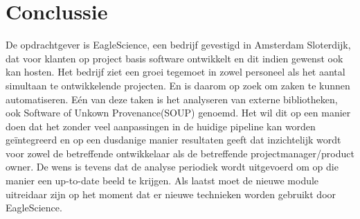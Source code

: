 \chapter{Conclussie}\label{ch:opdrachtconclussie}

De opdrachtgever is EagleScience, een bedrijf gevestigd in Amsterdam Sloterdijk, dat voor klanten op project basis software ontwikkelt en dit indien gewenst ook kan hosten. Het bedrijf ziet een groei tegemoet in zowel personeel als het aantal simultaan te ontwikkelende projecten. En is daarom op zoek om zaken te kunnen automatiseren. Eén van deze taken is het analyseren van externe bibliotheken, ook Software of Unkown Provenance(SOUP) genoemd. Het wil dit op een manier doen dat het zonder veel aanpassingen in de huidige pipeline kan worden geïntegreerd en op een dusdanige manier resultaten geeft dat inzichtelijk wordt voor zowel de betreffende ontwikkelaar als de betreffende projectmanager/product owner. De wens is tevens dat de analyse periodiek wordt uitgevoerd om op die manier een up-to-date beeld te krijgen. Als laatst moet de nieuwe module uitreidaar zijn op het moment dat er nieuwe technieken worden gebruikt door EagleScience.


